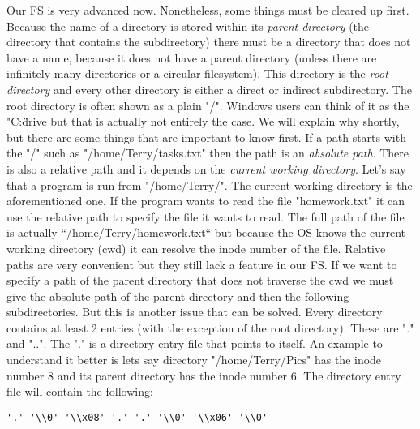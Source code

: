 \begin{enumerate}
Our FS is very advanced now. Nonetheless, some things must be cleared up first. Because the name of
a directory is stored within its \textit{parent directory} (the directory that contains the subdirectory)
there must be a directory that does not have a name, because it does not have a parent directory
(unless there are infinitely many directories or a circular filesystem). This directory is the \textit{root
directory} and every other directory is either a direct or indirect subdirectory. The root directory
is often shown as a plain "/". Windows users can think of it as the "C:\" drive but that is actually not
entirely the case. We will explain why shortly, but there are some things that are important to know
first. If a path starts with the "/" such as "/home/Terry/tasks.txt" then the path is an \textit{absolute
path}. There is also a relative path and it depends on the \textit{current working directory}. Let's say that
a program is run from "/home/Terry/". The current working directory is the aforementioned one. If the 
program wants to read the file "homework.txt" it can use the relative path to specify the file it
wants to read. The full path of the file is actually “/home/Terry/homework.txt“ but because the OS
knows the current working directory (cwd) it can resolve the inode number of the file. Relative paths
are very convenient but they still lack a feature in our FS. If we want to specify a path of the parent
directory that does not traverse the cwd we must give the absolute path of the parent directory and
then the following subdirectories. But this is another issue that can be solved. Every directory
contains at least 2 entries (with the exception of the root directory). These are "." and "..". The
"." is a directory entry file that points to itself. An example to understand it better is lets say
directory "/home/Terry/Pics" has the inode number 8 and its parent directory has the inode number 6.
The directory entry file will contain the following:
\newline
\begin{lstlisting}
'.' '\\0' '\\x08' '.' '.' '\\0' '\\x06' '\\0'
\end{lstlisting}


\end{enumerate}
